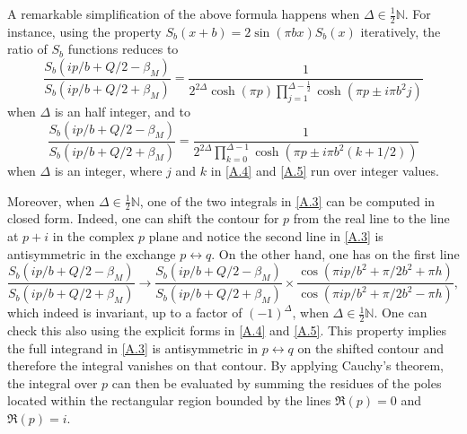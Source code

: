 \documentclass[a4paper,titlepage,12pt]{article}
\numberwithin{equation}{section}
\begin{document}
A remarkable simplification of the above formula happens when $\Delta \in \tfrac{1}{2} \mathbb{N}$. For instance, using the property $S_b(x+b)=2 \sin (\pi b x )S_b(x)$ iteratively, the ratio of $S_{b}$ functions reduces to
\begin{equation}\label{A.4}
\frac{S_b(ip/b+Q/2-\beta_M)}{S_b(ip/b+Q/2+\beta_M)}=\frac{1}{2^{2\Delta} \cosh (\pi p)\prod_{j=1}^{\Delta-\frac12}\cosh \left(\pi  p \pm i\pi b^2 j\right)}
\end{equation}
when $\Delta$ is an half integer, and to
\begin{equation}\label{A.5}
\frac{S_b(ip/b+Q/2-\beta_M)}{S_b(ip/b+Q/2+\beta_M)}=\frac{1}{2^{2\Delta}\prod_{k=0}^{\Delta-1}\cosh \left(\pi  p\pm i\pi b^2 (k+1/2)\right)}
\end{equation}
when $\Delta$ is an integer, where $j$ and $k$ in \eqref{A.4} and \eqref{A.5} run over integer values.

Moreover, when $\Delta \in \tfrac{1}{2} \mathbb{N}$, one of the two integrals in \eqref{A.3} can be computed in closed form. Indeed, one can shift the contour for $p$ from the real line to the line at $p+i$ in the complex $p$ plane and notice the second line in \eqref{A.3} is antisymmetric in the exchange $p\leftrightarrow q$. On the other hand, one has on the first line
\begin{equation}
\frac{S_b(ip/b+Q/2-\beta_M)}{S_b(ip/b+Q/2+\beta_M)}\rightarrow \frac{S_b(ip/b+Q/2-\beta_M)}{S_b(ip/b+Q/2+\beta_M)} \times \frac{\cos \left(\pi ip/b^2+\pi/2b^2+\pi h\right)}{\cos \left(\pi ip/b^2+\pi/2b^2- \pi h\right)},
\end{equation}
which indeed is invariant, up to a factor of $(-1)^{\Delta}$, when $\Delta \in \tfrac{1}{2} \mathbb{N}$. One can check this also using the explicit forms in \eqref{A.4} and \eqref{A.5}. This property implies the full integrand in \eqref{A.3} is antisymmetric in $p\leftrightarrow q$ on the shifted contour and therefore the integral vanishes on that contour. By applying Cauchy's theorem, the integral over $p$ can then be evaluated by summing the residues of the poles located within the rectangular region bounded by the lines $\Re(p) = 0$ and $\Re(p) = i$.
\end{document}
